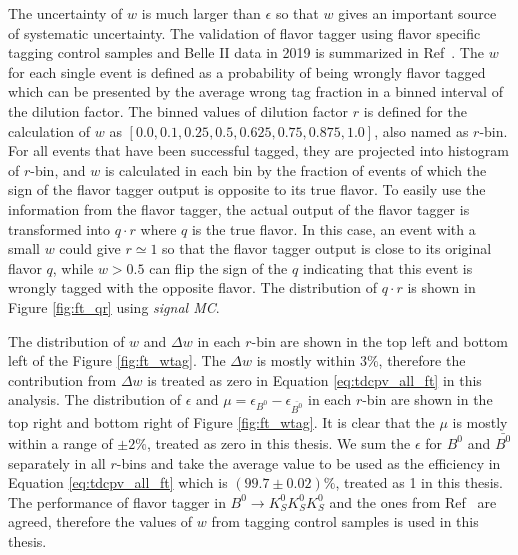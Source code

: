 The uncertainty of $w$ is much larger than $\epsilon$ so that $w$ gives an important source of systematic uncertainty. The validation of flavor tagger using flavor specific tagging control samples and Belle II data in 2019 is summarized in Ref~\cite{abudinen2020first}. The $w$ for each single event is defined as a probability of being wrongly flavor tagged which can be presented by the average wrong tag fraction in a binned interval of the dilution factor. The binned values of dilution factor $r$ is defined for the calculation of $w$ as $[0.0, 0.1, 0.25, 0.5, 0.625, 0.75, 0.875, 1.0]$, also named as $r$-bin. For all events that have been successful tagged, they are projected into histogram of $r$-bin, and $w$ is calculated in each bin by the fraction of events of which the sign of the flavor tagger output is opposite to its true flavor. To easily use the information from the flavor tagger, the actual output of the flavor tagger is transformed into $q\cdot r$ where $q$ is the true flavor. In this case, an event with a small $w$ could give $r\simeq 1$ so that the flavor tagger output is close to its original flavor $q$, while $w>0.5$ can flip the sign of the $q$ indicating that this event is wrongly tagged with the opposite flavor. The distribution of $q\cdot r$ is shown in Figure \ref{fig:ft_qr} using \textit{signal MC}.

The distribution of $w$ and $\Delta w$ in each $r$-bin are shown in the top left and bottom left of the Figure \ref{fig:ft_wtag}. The $\Delta w$ is mostly within $3\%$, therefore the contribution from $\Delta w$ is treated as zero in Equation \ref{eq:tdcpv_all_ft} in this analysis. The distribution of $\epsilon$ and $\mu = \epsilon_{B^0}-\epsilon_{\bar{B^0}}$ in each $r$-bin are shown in the top right and bottom right of Figure \ref{fig:ft_wtag}. It is clear that the $\mu$ is mostly within a range of $\pm2\%$, treated as zero in this thesis. We sum the $\epsilon$ for $B^0$ and $\bar{B^0}$ separately in all $r$-bins and take the average value to be used as the efficiency in Equation \ref{eq:tdcpv_all_ft} which is $(99.7\pm0.02)\%$, treated as 1 in this thesis. The performance of flavor tagger in $B^0 \to K_S^0  K_S^0  K_S^0$ and the ones from Ref~\cite{abudinen2020first} are agreed, therefore the values of $w$ from tagging control samples is used in this thesis.

